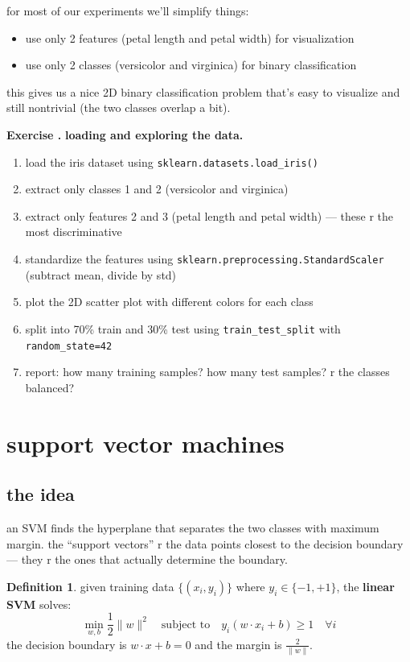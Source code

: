 \documentclass[11pt,a4paper]{article}
\theoremstyle{definition}
\newtheorem{definition}{Definition}[section]
\theoremstyle{remark}
\newcounter{exercise}[section]
\newenvironment{exercise}{\refstepcounter{exercise}\par\medskip\noindent\textbf{Exercise \theexercise.}\rmfamily}{\medskip}
\begin{document}
for most of our experiments we'll simplify things:
\begin{itemize}[leftmargin=*]
  \item use only 2 features (petal length and petal width) for visualization
  \item use only 2 classes (versicolor and virginica) for binary classification
\end{itemize}

this gives us a nice 2D binary classification problem that's easy to visualize and still nontrivial (the two classes overlap a bit).

\begin{exercise}
\textbf{loading and exploring the data.}
\begin{enumerate}[leftmargin=*]
  \item load the iris dataset using \texttt{sklearn.datasets.load\_iris()}
  \item extract only classes 1 and 2 (versicolor and virginica)
  \item extract only features 2 and 3 (petal length and petal width) --- these r the most discriminative
  \item standardize the features using \texttt{sklearn.preprocessing.StandardScaler} (subtract mean, divide by std)
  \item plot the 2D scatter plot with different colors for each class
  \item split into 70\% train and 30\% test using \texttt{train\_test\_split} with \texttt{random\_state=42}
  \item report: how many training samples? how many test samples? r the classes balanced?
\end{enumerate}
\end{exercise}

\section{support vector machines}

\subsection{the idea}

an SVM finds the hyperplane that separates the two classes with maximum margin. the ``support vectors'' r the data points closest to the decision boundary --- they r the ones that actually determine the boundary.

\begin{definition}
given training data $\{(x_i, y_i)\}$ where $y_i \in \{-1, +1\}$, the \textbf{linear SVM} solves:
\[
\min_{w, b} \frac{1}{2}\|w\|^2 \quad \text{subject to} \quad y_i(w \cdot x_i + b) \geq 1 \quad \forall i
\]
the decision boundary is $w \cdot x + b = 0$ and the margin is $\frac{2}{\|w\|}$.
\end{definition}
\end{document}
